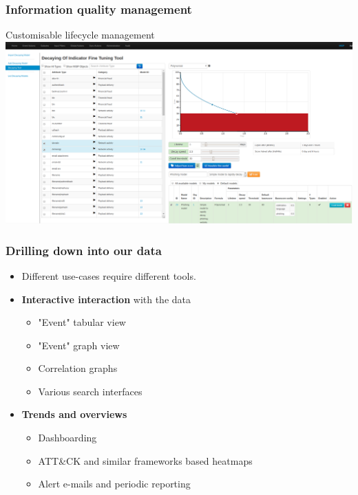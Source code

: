\begin{frame}
    \frametitle{Information quality management}
    Customisable lifecycle management
    \includegraphics[width=1.00\linewidth]{decaying-tool.png}
\end{frame}



\begin{frame}
\frametitle{Drilling down into our data}
    \begin{itemize}
        \item Different use-cases require different tools.
        \item {\bf Interactive interaction} with the data
        \begin{itemize}
                \item "Event" tabular view
                \item "Event" graph view
                \item Correlation graphs
                \item Various search interfaces
        \end{itemize}
        \item {\bf Trends and overviews}
        \begin {itemize}
                \item Dashboarding
                \item ATT\&CK and similar frameworks based heatmaps
                \item Alert e-mails and periodic reporting
        \end{itemize}
    \end{itemize}
\end{frame}

